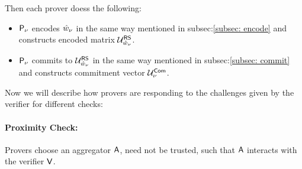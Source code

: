 Then each prover doess the following:
\begin{itemize}
	\item $\mathsf{P}_{\nu}$ encodes $\hat{w}_{\nu}$ in the same way mentioned in subsec:\ref{subsec: encode} and constructs encoded matrix $\mathcal{U}^{\mathsf{RS}}_{\hat{w}_{\nu}}$.
	\item $\mathsf{P}_{\nu}$ commits to $\mathcal{U}^{\mathsf{RS}}_{\hat{w}_{\nu}}$ in the same way mentioned in subsec:\ref{subsec: commit} and constructs commitment vector $\mathcal{U}^{\mathsf{Com}}_{\nu}$.
\end{itemize}

Now we will describe how provers are responding to the challenges given by the verifier for different checks:
\paragraph{Proximity Check:}
Provers choose an aggregator $\mathsf{A}$, need not be trusted, such that $\mathsf{A}$ interacts with the verifier $\mathsf{V}$. 

